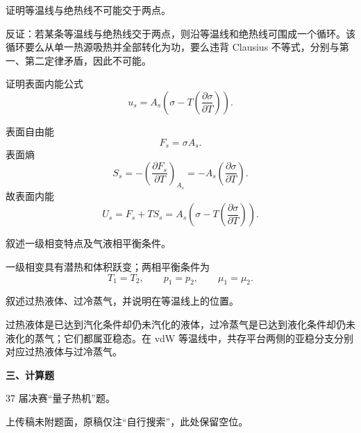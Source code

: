 \begin{question}
证明等温线与绝热线不可能交于两点。
\begin{solution}
反证：若某条等温线与绝热线交于两点，则沿等温线和绝热线可围成一个循环。该循环要么从单一热源吸热并全部转化为功，要么违背 Clausius 不等式，分别与第一、第二定律矛盾，因此不可能。
\end{solution}
\end{question}

\begin{question}
证明表面内能公式
\[
u_s=A_s\left(\sigma-T\left(\frac{\partial\sigma}{\partial T}\right)\right).
\]
\begin{solution}
表面自由能
\[
F_s=\sigma A_s.
\]
表面熵
\[
S_s=-\left(\frac{\partial F_s}{\partial T}\right)_{A_s}=-A_s\left(\frac{\partial\sigma}{\partial T}\right).
\]
故表面内能
\[
U_s=F_s+TS_s=A_s\left(\sigma-T\left(\frac{\partial\sigma}{\partial T}\right)\right).
\]
\end{solution}
\end{question}

\begin{question}
叙述一级相变特点及气液相平衡条件。
\begin{solution}
一级相变具有潜热和体积跃变；两相平衡条件为
\[
T_1=T_2,\qquad p_1=p_2,\qquad \mu_1=\mu_2.
\]
\end{solution}
\end{question}

\begin{question}
叙述过热液体、过冷蒸气，并说明在等温线上的位置。
\begin{solution}
过热液体是已达到汽化条件却仍未汽化的液体，过冷蒸气是已达到液化条件却仍未液化的蒸气；它们都属亚稳态。在 vdW 等温线中，共存平台两侧的亚稳分支分别对应过热液体与过冷蒸气。
\end{solution}
\end{question}

\textbf{三、计算题}
\begin{question}
37 届决赛“量子热机”题。
\begin{solution}
上传稿未附题面，原稿仅注“自行搜索”，此处保留空位。
\end{solution}
\end{question}

